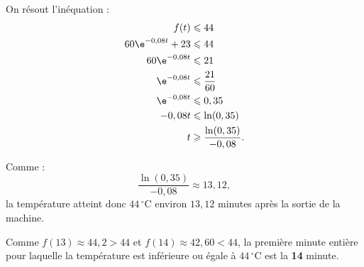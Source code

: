 \medskip

On résout l'inéquation :
\begin{align*}
f(t) &\leqslant 44 \\
60\e^{-0,08t} + 23 &\leqslant 44 \\
60\e^{-0,08t} &\leqslant 21 \\
\e^{-0,08t} &\leqslant \dfrac{21}{60} \\
\e^{-0,08t} &\leqslant 0,35 \\
-0,08t &\leqslant \ln(0,35) \\
t &\geqslant \dfrac{\ln(0,35)}{-0,08}.
\end{align*}

Comme :
\[\dfrac{\ln(0,35)}{-0,08} \approx 13,12,\]
la température atteint donc $44\,^\circ\mathrm{C}$ environ $13,12$ minutes après la sortie de la machine.

Comme $f(13) \approx 44,2 > 44$ et $f(14) \approx 42,60 < 44$,
la première minute entière pour laquelle la température est inférieure ou égale à $44\,^\circ\mathrm{C}$ est la \textbf{14} minute.
